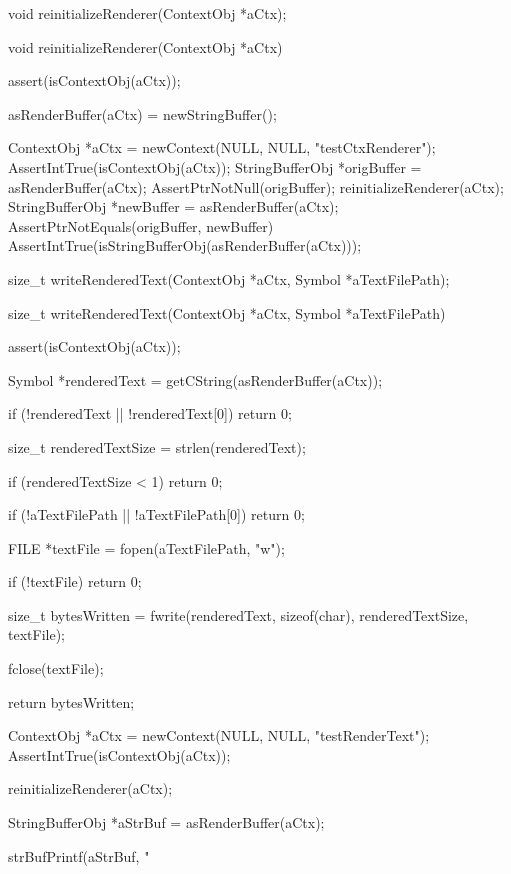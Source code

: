 \startCHeader
void reinitializeRenderer(ContextObj *aCtx);
\stopCHeader

\startCCode
void reinitializeRenderer(ContextObj *aCtx) {
  assert(isContextObj(aCtx));
  
  asRenderBuffer(aCtx) = newStringBuffer();
}
\stopCCode


\startCTest
  ContextObj *aCtx = newContext(NULL, NULL, "testCtxRenderer");
  AssertIntTrue(isContextObj(aCtx));
  StringBufferObj *origBuffer = asRenderBuffer(aCtx);
  AssertPtrNotNull(origBuffer);
  reinitializeRenderer(aCtx);
  StringBufferObj *newBuffer  = asRenderBuffer(aCtx);
  AssertPtrNotEquals(origBuffer, newBuffer)
  AssertIntTrue(isStringBufferObj(asRenderBuffer(aCtx)));
\stopCTest
\stopTestCase
\stopTestSuite

\startTestSuite[writeRenderedText]

\startCHeader
size_t writeRenderedText(ContextObj *aCtx, Symbol *aTextFilePath);
\stopCHeader

\startCCode
size_t writeRenderedText(ContextObj *aCtx, Symbol *aTextFilePath) {
  assert(isContextObj(aCtx));

  Symbol *renderedText = getCString(asRenderBuffer(aCtx));
  
  if (!renderedText || !renderedText[0]) return 0;
  
  size_t renderedTextSize = strlen(renderedText);

  if (renderedTextSize < 1) return 0;
  
  if (!aTextFilePath || !aTextFilePath[0]) return 0;
  
  FILE *textFile = fopen(aTextFilePath, "w");
  
  if (!textFile) return 0;

  size_t bytesWritten =
    fwrite(renderedText, sizeof(char), renderedTextSize, textFile);
  
  fclose(textFile);
  
  return bytesWritten;
}
\stopCCode


\startCTest
  ContextObj *aCtx = newContext(NULL, NULL, "testRenderText");
  AssertIntTrue(isContextObj(aCtx));
  
  reinitializeRenderer(aCtx);
  
  StringBufferObj *aStrBuf = asRenderBuffer(aCtx);
  
  strBufPrintf(aStrBuf, "%
  
